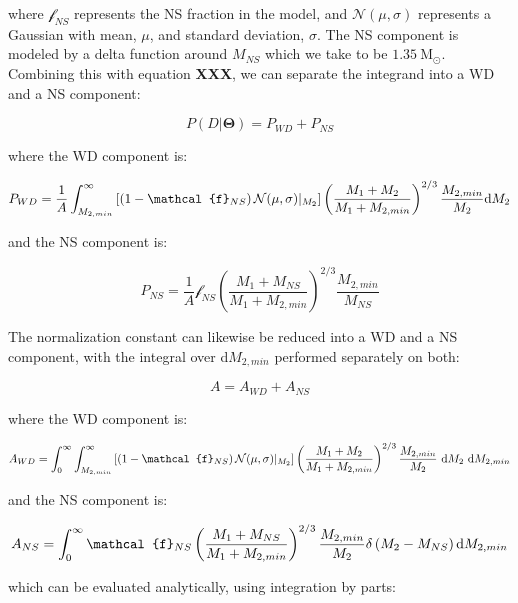 \documentclass[letterpaper,12pt,preprint]{aastex}
\newcommand{\Msun}{\mathrm{M}_\odot}
\begin{document}
where $\mathcal{f}_{NS}$ represents the NS fraction in the model, and $\mathcal{N}(\mu , \sigma)$ represents a Gaussian with mean, $\mu$, and standard deviation, $\sigma$. The NS component is modeled by a delta function around $M_{NS}$ which we take to be $1.35 ~\Msun$. Combining this with equation {\bf XXX}, we can separate the integrand into a WD and a NS component:

\begin{equation}
P(D|\mathbf{\Theta}) = P_{WD} + P_{NS}
\end{equation}

where the WD component is:

\begin{equation}
P_{WD} = \frac{1}{A} \int_{M_{2,min}}^{\infty} \left[ \left( 1-\mathcal{f}_{NS} \right) \mathcal{N}(\mu , \sigma)|_{M_2} \right]  \left( \frac{M_1 + M_2}{M_1 + M_{2,min}} \right)^{2/3} \frac{M_{2,min}}{M_2} {\rm d}M_2 
\end{equation}

and the NS component is:

\begin{equation}
P_{NS} = \frac{1}{A} \mathcal{f}_{NS}\left( \frac{M_1 + M_{NS}}{M_1 + M_{2,min}} \right)^{2/3} \frac{M_{2,min}}{M_{NS}}
\end{equation}

The normalization constant can likewise be reduced into a WD and a NS component, with the integral over d$M_{2,min}$ performed separately on both:

\begin{equation}
A = A_{WD} + A_{NS}
\end{equation}

where the WD component is:

\begin{equation}
A_{WD} = \int_0^{\infty} \int_{M_{2,min}}^{\infty} \left[ \left( 1-\mathcal{f}_{NS} \right) \mathcal{N}(\mu , \sigma)|_{M_2} \right]  \left( \frac{M_1 + M_2}{M_1 + M_{2,min}} \right)^{2/3} \frac{M_{2,min}}{M_2}\ {\rm d}M_2\ {\rm d}M_{2,min}
\end{equation}

and the NS component is:

\begin{equation}
A_{NS} = \int_0^{\infty} \mathcal{f}_{NS}\left( \frac{M_1 + M_{NS}}{M_1 + M_{2,min}} \right)^{2/3} \frac{M_{2,min}}{M_2} \delta \left( M_2 - M_{NS} \right) {\rm d}M_{2,min}
\end{equation}

which can be evaluated analytically, using integration by parts:
\end{document}

